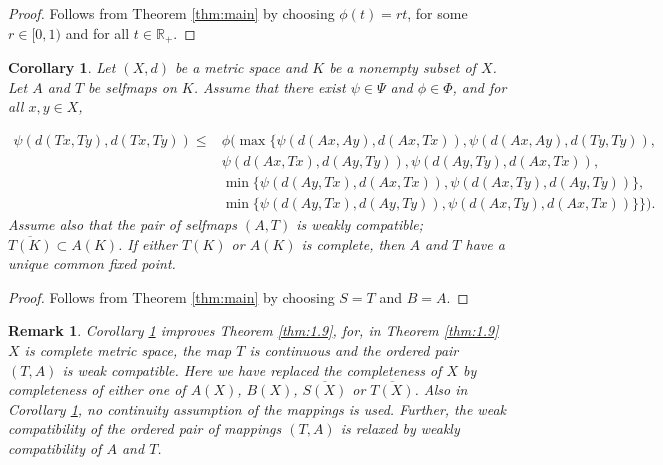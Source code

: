 \documentclass[11]{article}
\newtheorem{remark}[definition]{Remark}
\newtheorem{corollary}[definition]{Corollary}
\numberwithin{equation}{section}
\begin{document}
\begin{proof}
Follows from Theorem \ref{thm:main} by choosing $\phi(t)=rt$, for some $r\in[0,1)$ and for all $t\in \mathbb{R}_{+}$.
\end{proof}

\begin{corollary}\label{cor:2.3}
Let $(X,d)$ be a metric space and $K$ be a nonempty subset of $X$. Let $A$ and $T$ be selfmaps on $K$. Assume that there exist $\psi\in\Psi$ and $\phi\in\Phi$, and for all $x,y\in X$,

\begin{align*}
    \psi(d(Tx,Ty),d(Tx,Ty)) \leq &\phi(\max\{\psi(d(Ax,Ay),d(Ax,Tx)), \psi(d(Ax,Ay),d(Ty,Ty)),\\
 &\psi(d(Ax,Tx),d(Ay,Ty)), \psi(d(Ay,Ty),d(Ax,Tx)),\\
 &\min\{\psi(d(Ay,Tx),d(Ax,Tx)), \psi(d(Ax,Ty),d(Ay,Ty))\},\\
 &\min\{\psi(d(Ay,Tx),d(Ay,Ty)), \psi(d(Ax,Ty),d(Ax,Tx))\}\}).
\end{align*}
Assume also that the pair of selfmaps $(A,T)$ is weakly compatible; $\overline{T(K)}\subset A(K)$. If either $T(K)$ or $A(K)$ is complete, then $A$ and $T$ have a unique common fixed point.
\end{corollary}

\begin{proof}
Follows from Theorem \ref{thm:main} by choosing $S=T$ and $B=A$.
\end{proof}

\begin{remark}\label{rem:2.4}
Corollary \ref{cor:2.3} improves Theorem \ref{thm:1.9}, for, in Theorem \ref{thm:1.9} $X$ is complete metric space, the map $T$ is continuous and the ordered pair $(T,A)$ is weak compatible. Here we have replaced the completeness of $X$ by completeness of either one of $A(X)$, $B(X)$, $\overline{S(X)}$ or $\overline{T(X)}$. Also in Corollary \ref{cor:2.3}, no continuity assumption of the mappings is used. Further, the weak compatibility of the ordered pair of mappings $(T,A)$ is relaxed by weakly compatibility of $A$ and $T$.
\end{remark}
\end{document}

